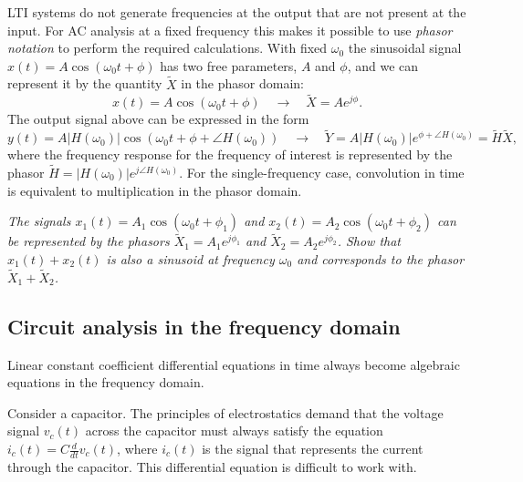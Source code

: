 \documentclass[10pt]{beamer}
\begin{document}
LTI systems do not generate frequencies at the output that are not present at the input.  For AC analysis at a fixed frequency this makes it possible to use {\em phasor notation} to perform the required calculations.  With fixed $\omega_0$ the sinusoidal signal $x(t) = A \cos(\omega_0 t + \phi)$ has two free parameters, $A$ and $\phi$, and we can represent it by the quantity $\tilde{X}$ in the phasor domain:
\begin{equation*}
  x(t) = A \cos(\omega_0 t + \phi) \quad \longrightarrow \quad \tilde{X} = A e^{j \phi}.
\end{equation*}
The output signal above can be expressed in the form
\begin{equation*}
  y(t) = A |H(\omega_0)| \cos(\omega_0 t + \phi + \angle H(\omega_0)) \quad \longrightarrow \quad
  \tilde{Y} = A |H(\omega_0)| e^{\phi + \angle H(\omega_0)} = \tilde{H} \tilde{X},
\end{equation*}
where the frequency response for the frequency of interest is represented by the phasor $\tilde{H} = |H(\omega_0)| e^{j \angle H(\omega_0)}$.  For the single-frequency case, convolution in time is equivalent to multiplication in the phasor domain.

{\em The signals $x_1(t) = A_1 \cos(\omega_0 t + \phi_1)$ and $x_2(t) = A_2 \cos(\omega_0 t + \phi_2)$ can be represented by the phasors $\tilde{X}_1 = A_1 e^{j \phi_1}$ and $\tilde{X}_2 = A_2 e^{j \phi_2}$.  Show that $x_1(t) + x_2(t)$ is also a sinusoid at frequency $\omega_0$ and corresponds to the phasor $\tilde{X}_1 + \tilde{X}_2$.}

\subsection{Circuit analysis in the frequency domain}

Linear constant coefficient differential equations in time always become algebraic equations in the frequency domain.

Consider a capacitor.  The principles of electrostatics demand that the voltage signal $v_c(t)$ across the capacitor must always satisfy the equation $i_c(t) = C \frac{d}{dt} v_c(t)$, where $i_c(t)$ is the signal that represents the current through the capacitor.  This differential equation is difficult to work with.
\end{document}
